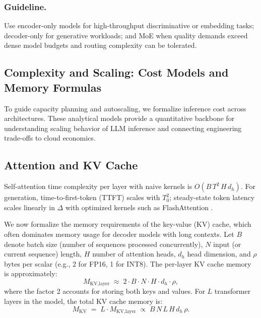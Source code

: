 \subsubsection{Guideline.} Use encoder-only models for high-throughput discriminative or embedding tasks; decoder-only for generative workloads; and MoE when quality demands exceed dense model budgets and routing complexity can be tolerated.

\subsection{Complexity and Scaling: Cost Models and Memory Formulas}
\label{sec:perf-cost-models}

\label{sec:complexity-scaling}

To guide capacity planning and autoscaling, we formalize inference cost across architectures. These analytical models provide a quantitative backbone for understanding scaling behavior of LLM inference and connecting engineering trade-offs to cloud economics.

\subsection{Attention and KV Cache}
\label{sec:perf-attention-kv-cache}
Self-attention time complexity per layer with naive kernels is $O(B\,T^2\,H\,d_h)$. For generation, time-to-first-token (TTFT) scales with $T_0^2$; steady-state token latency scales linearly in $\Delta$ with optimized kernels such as FlashAttention \cite{Dao2023FlashAttention2}.

We now formalize the memory requirements of the key-value (KV) cache, which often dominates memory usage for decoder models with long contexts. Let $B$ denote batch size (number of sequences processed concurrently), $N$ input (or current sequence) length, $H$ number of attention heads, $d_h$ head dimension, and $\rho$ bytes per scalar (e.g., 2 for FP16, 1 for INT8). The per-layer KV cache memory is approximately:
\begin{equation}
M_{\text{KV,layer}} \;\approx\; 2 \cdot B \cdot N \cdot H \cdot d_h \cdot \rho,
\label{eq:kv-layer}
\end{equation}
where the factor 2 accounts for storing both keys and values. For $L$ transformer layers in the model, the total KV cache memory is:
\begin{equation}
M_{\text{KV}} \;=\; L \cdot M_{\text{KV,layer}} \;\propto\; B\,N\,L\,H\,d_h\,\rho.
\label{eq:kv-total}
\end{equation}

